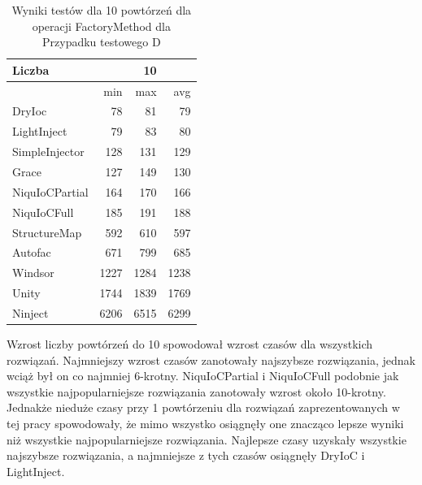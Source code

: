 \documentclass[12pt]{article}
\begin{document}
\begin{table}[H]
\captionsetup{belowskip=0pt,aboveskip=0pt}
\begin{center}
\begin{small}
	\begin{tabular}{ | l | r r r | }
    		\hline
Liczba & & 10 & \\ \hline
 & min & max & avg \\ \hline
DryIoc & 78 & 81 & 79 \\ \hline
LightInject & 79 & 83 & 80 \\ \hline
SimpleInjector & 128 & 131 & 129 \\ \hline
Grace & 127 & 149 & 130 \\ \hline
NiquIoCPartial & 164 & 170 & 166 \\ \hline
NiquIoCFull & 185 & 191 & 188 \\ \hline
StructureMap & 592 & 610 & 597 \\ \hline
Autofac & 671 & 799 & 685 \\ \hline
Windsor & 1227 & 1284 & 1238 \\ \hline
Unity & 1744 & 1839 & 1769 \\ \hline
Ninject & 6206 & 6515 & 6299 \\ \hline
  	\end{tabular}
\end{small}
\end{center}
\caption{Wyniki testów dla 10 powtórzeń dla operacji FactoryMethod dla Przypadku testowego D}
\label{TestCaseB_FactoryMethod10}
\end{table}
Wzrost liczby powtórzeń do 10 spowodował wzrost czasów dla wszystkich rozwiązań. Najmniejszy wzrost czasów zanotowały najszybsze rozwiązania, jednak wciąż był on co najmniej 6-krotny. NiquIoCPartial i NiquIoCFull podobnie jak wszystkie najpopularniejsze rozwiązania zanotowały wzrost około 10-krotny. Jednakże nieduże czasy przy 1 powtórzeniu dla rozwiązań zaprezentowanych w tej pracy spowodowały, że mimo wszystko osiągnęły one znacząco lepsze wyniki niż wszystkie najpopularniejsze rozwiązania. Najlepsze czasy uzyskały wszystkie najszybsze rozwiązania, a najmniejsze z tych czasów osiągnęły DryIoC i LightInject.



\clearpage
\end{document}
